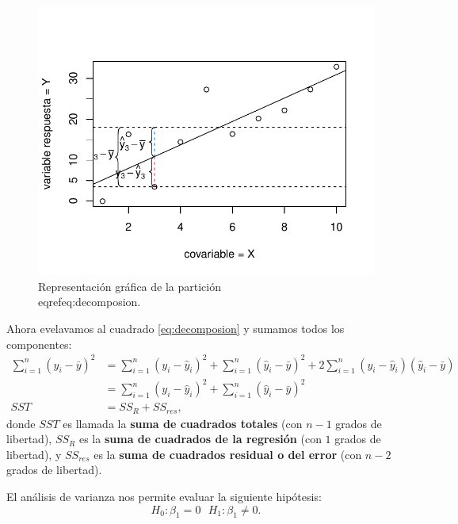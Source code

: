 \documentclass[
]{article}
\begin{document}
\begin{figure}

{\centering \includegraphics{MLGI_files/figure-latex/anovafig-1} 

}

\caption{Representación gráfica de la partición \\eqref{eq:decomposion}.}\label{fig:anovafig}
\end{figure}

Ahora evelavamos al cuadrado \eqref{eq:decomposion} y sumamos todos los componentes:
\begin{equation}
\begin{split}
\sum_{i=1}^{n} (y_{i} - \bar{y})^{2} &= \sum_{i=1}^{n} (y_{i} - \widehat{y}_{i})^{2} + \sum_{i=1}^{n}(\widehat{y}_{i} - \bar{y})^{2} + 2 \sum_{i=1}^{n}(y_{i} - \widehat{y}_{i})(\widehat{y}_{i} - \bar{y}) \\
&= \sum_{i=1}^{n} (y_{i} - \widehat{y}_{i})^{2} + \sum_{i=1}^{n}(\widehat{y}_{i} - \bar{y})^{2} \\
SST &= SS_{R} + SS_{res},
\end{split}
\label{eq:ss}
\end{equation}
donde \(SST\) es llamada la \textbf{suma de cuadrados totales} (con \(n-1\) grados de libertad), \(SS_{R}\) es la \textbf{suma de cuadrados de la regresión} (con \(1\) grados de libertad), y \(SS_{res}\) es la \textbf{suma de cuadrados residual o del error} (con \(n-2\) grados de libertad).

El análisis de varianza nos permite evaluar la siguiente hipótesis:
\begin{equation}
H_{0}: \beta_{1} = 0 \mbox{  }H_{1}:  \beta_{1} \neq 0.
\label{eq:anova}
\end{equation}
\end{document}
